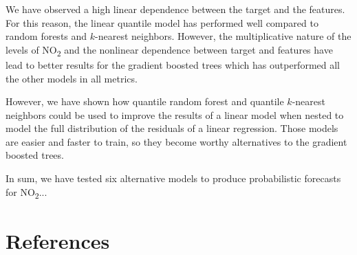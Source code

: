 \documentclass[a4paper,twocolumn,5p]{elsarticle}
\begin{document}
We have observed a high linear dependence between the target and the
features. For this reason, the linear quantile model has performed
well compared to random forests and $k$-nearest neighbors. However,
the multiplicative nature of the levels of NO\textsubscript{2} and the
nonlinear dependence between target and features have lead to better
results for the gradient boosted trees which has outperformed all the
other models in all metrics.

However, we have shown how quantile random forest and quantile
$k$-nearest neighbors could be used to improve the results of a linear
model when nested to model the full distribution of the residuals of a
linear regression. Those models are easier and faster to train, so
they become worthy alternatives to the gradient boosted trees.

In sum, we have tested six alternative models to produce probabilistic
forecasts for NO\textsubscript{2}... 

\section{References}


\end{document}

